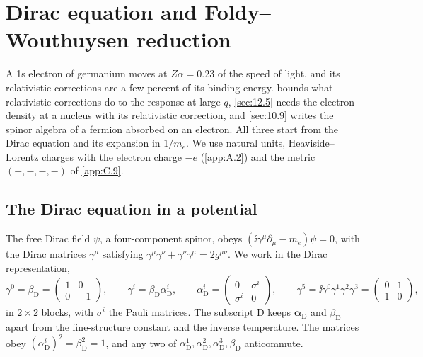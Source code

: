 \section{Dirac equation and Foldy--Wouthuysen reduction}\label{app:C.15}

A 1s electron of germanium moves at $Z\alpha = 0.23$ of the speed of light, and its relativistic corrections are a few percent of its binding energy.  bounds what relativistic corrections do to the response at large $q$, \cref{sec:12.5} needs the electron density at a nucleus with its relativistic correction, and \cref{sec:10.9} writes the spinor algebra of a fermion absorbed on an electron. All three start from the Dirac equation and its expansion in $1/m_e$. We use natural units, Heaviside--Lorentz charges with the electron charge $-e$ (\cref{app:A.2}) and the metric $(+,-,-,-)$ of \cref{app:C.9}.

\subsection{The Dirac equation in a potential}

The free Dirac field $\psi$, a four-component spinor, obeys $(\ii\gamma^\mu\partial_\mu - m_e)\psi = 0$, with the Dirac matrices $\gamma^\mu$ satisfying $\gamma^\mu\gamma^\nu + \gamma^\nu\gamma^\mu = 2g^{\mu\nu}$. We work in the Dirac representation,
\begin{equation}
  \gamma^0 = \beta_{\mathrm{D}} = \begin{pmatrix} 1 & 0\\ 0 & -1 \end{pmatrix}, \qquad
  \gamma^i = \beta_{\mathrm{D}}\alpha_{\mathrm{D}}^i, \qquad
  \alpha_{\mathrm{D}}^i = \begin{pmatrix} 0 & \sigma^i\\ \sigma^i & 0 \end{pmatrix}, \qquad
  \gamma^5 = \ii\gamma^0\gamma^1\gamma^2\gamma^3 = \begin{pmatrix} 0 & 1\\ 1 & 0 \end{pmatrix},
  \label{eq:C.15-gamma}
\end{equation}
in $2\times2$ blocks, with $\sigma^i$ the Pauli matrices. The subscript D keeps $\boldsymbol{\alpha}_{\mathrm{D}}$ and $\beta_{\mathrm{D}}$ apart from the fine-structure constant and the inverse temperature. The matrices obey $(\alpha_{\mathrm{D}}^i)^2 = \beta_{\mathrm{D}}^2 = 1$, and any two of $\alpha_{\mathrm{D}}^1, \alpha_{\mathrm{D}}^2, \alpha_{\mathrm{D}}^3, \beta_{\mathrm{D}}$ anticommute.

